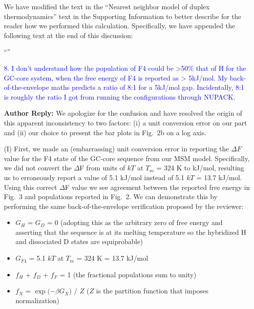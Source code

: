 \documentclass[11pt,a4paper]{letter} %
\newcommand*{\rood}[1]{{\color{red}{#1}}}
\begin{document}
We have modified the text in the ``Nearest neighbor model of duplex thermodynamics'' text in the Supporting Information to better describe for the reader how we performed this calculation. Specifically, we have appended the following text at the end of this discussion:

``\rood{In applying the NN model to each macrostate, we made the simplifying assumption that the ensemble of microstates constituting each macrostate could be represented by a single pattern of Watson-Crick base pairing that are schematically illustrated in Fig.~2a. In reality, each macrostate is composed of an ensemble of microstates that may have slightly different base pairing patterns and explicitly averaging over all of these microstates may change the predictions of the NN model. Recalculating the NN predictions by explicitly averaging over all microstates in the macrostate leads to changes in the $\Delta F = F - F_H$ values reported in Fig.~3 (i.e., the free energy of each macrostate relative to the hybridized state) of $<$1 kJ/mol. As such, representing each macrostate by a single representative microstate and base pairing pattern is a highly accurate simplifying approximation for the purposes of this calculation.}''

\textcolor{blue}{8. I don't understand how the population of F4 could be >50\% that of H for the GC-core system, when the free energy of F4 is reported as > 5kJ/mol. My back-of-the-envelope maths predicts a ratio of 8:1 for a 5kJ/mol gap. Incidentally, 8:1 is roughly the ratio I got from running the configurations through NUPACK.}

\textbf{Author Reply:}  We apologize for the confusion and have resolved the origin of this apparent inconsistency to two factors: (i) a unit conversion error on our part and (ii) our choice to present the bar plots in Fig.~2b on a log axis.

(I) First, we made an (embarrassing) unit conversion error in reporting the $\Delta F$ value for the F4 state of the GC-core sequence from our MSM model. Specifically, we did not convert the $\Delta$F from units of $kT$ at $T_m$ = 324 K to kJ/mol, resulting us to erroneously report a value of 5.1 kJ/mol instead of 5.1 $kT$ = 13.7 kJ/mol. Using this correct $\Delta$F value we see agreement between the reported free energy in Fig.~3 and populations reported in Fig.~2. We can demonstrate this by performing the same back-of-the-envelope verification proposed by the reviewer:

\begin{itemize}
\item $G_H$ = $G_D$ = 0 (adopting this as the arbitrary zero of free energy and asserting that the sequence is at its melting temperature so the hybridized H and dissociated D states are equiprobable)
\item $G_{F4}$ = 5.1 $kT$ at $T_m$ = 324 K = 13.7 kJ/mol
\item $f_H$ + $f_D$ + $f_F$ = 1 (the fractional populations sum to unity)
\item $f_X$ = $\exp (-\beta G_X$) / $Z$ ($Z$ is the partition function that imposes normalization)
\end{itemize}
\end{document}
